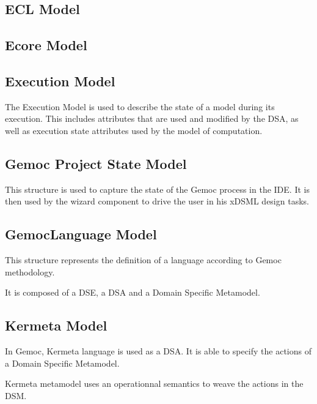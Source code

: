 \documentclass{gemoc} %
\begin{document}
\subsection{ECL Model}


\subsection{Ecore Model}


\subsection{Execution Model}
The Execution Model is used to describe the state of a model during its execution. This includes attributes that are used and modified by the DSA, as well as execution state attributes used by the model of computation.

\subsection{Gemoc Project State Model}
This structure is used to capture the state of the Gemoc process in the IDE. It is then used by the wizard component to drive the user in his xDSML design tasks.

\subsection{GemocLanguage Model}
This structure represents the definition of a language according to Gemoc methodology.

It is composed of a DSE, a DSA and a Domain Specific Metamodel.


\subsection{Kermeta Model}
In Gemoc, Kermeta language is used as a DSA.
It is able to specify the actions of a Domain Specific Metamodel.

Kermeta metamodel uses an operationnal semantics to weave the actions in the DSM.
\end{document}
